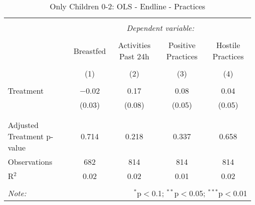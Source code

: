 
\begin{table}[!htbp] \centering 
  \caption{Only Children 0-2: OLS - Endline - Practices} 
  \label{tbl:Only Children 0-2: OLS - Endline - Practices} 
\begin{tabular}{@{\extracolsep{5pt}}lcccc} 
\\[-1.8ex]\hline 
\hline \\[-1.8ex] 
 & \multicolumn{4}{c}{\textit{Dependent variable:}} \\ 
\cline{2-5} 
\\[-1.8ex] & Breastfed & Activities Past 24h & Positive Practices & Hostile Practices \\ 
\\[-1.8ex] & (1) & (2) & (3) & (4)\\ 
\hline \\[-1.8ex] 
 Treatment & $-$0.02 & 0.17 & 0.08 & 0.04 \\ 
  & (0.03) & (0.08) & (0.05) & (0.05) \\ 
  & & & & \\ 
\hline \\[-1.8ex] 
Adjusted Treatment p-value & 0.714 & 0.218 & 0.337 & 0.658 \\ 
Observations & 682 & 814 & 814 & 814 \\ 
R$^{2}$ & 0.02 & 0.02 & 0.01 & 0.02 \\ 
\hline 
\hline \\[-1.8ex] 
\textit{Note:}  & \multicolumn{4}{r}{$^{*}$p$<$0.1; $^{**}$p$<$0.05; $^{***}$p$<$0.01} \\ 
\end{tabular} 
\end{table} 
